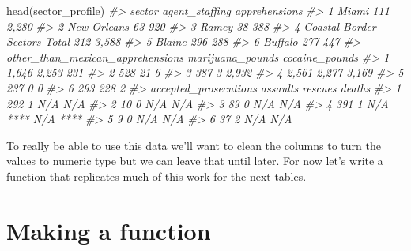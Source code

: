 \documentclass[
  12pt,
]{book}
\newenvironment{Shaded}{\begin{snugshade}}{\end{snugshade}}
\newcommand{\CommentTok}[1]{\textcolor[rgb]{0.37,0.37,0.37}{\textit{#1}}}
\newcommand{\FunctionTok}[1]{\textcolor[rgb]{0,0,0}{#1}}
\newcommand{\NormalTok}[1]{#1}
\begin{document}
\begin{Shaded}
\begin{Highlighting}[]
\FunctionTok{head}\NormalTok{(sector\_profile)}
\CommentTok{\#\textgreater{}                         sector agent\_staffing apprehensions}
\CommentTok{\#\textgreater{} 1                        Miami            111         2,280}
\CommentTok{\#\textgreater{} 2                  New Orleans             63           920}
\CommentTok{\#\textgreater{} 3                        Ramey             38           388}
\CommentTok{\#\textgreater{} 4 Coastal Border Sectors Total            212         3,588}
\CommentTok{\#\textgreater{} 5                       Blaine            296           288}
\CommentTok{\#\textgreater{} 6                      Buffalo            277           447}
\CommentTok{\#\textgreater{}   other\_than\_mexican\_apprehensions marijuana\_pounds cocaine\_pounds}
\CommentTok{\#\textgreater{} 1                            1,646            2,253            231}
\CommentTok{\#\textgreater{} 2                              528               21              6}
\CommentTok{\#\textgreater{} 3                              387                3          2,932}
\CommentTok{\#\textgreater{} 4                            2,561            2,277          3,169}
\CommentTok{\#\textgreater{} 5                              237                0              0}
\CommentTok{\#\textgreater{} 6                              293              228              2}
\CommentTok{\#\textgreater{}   accepted\_prosecutions assaults           rescues deaths}
\CommentTok{\#\textgreater{} 1                   292        1               N/A    N/A}
\CommentTok{\#\textgreater{} 2                    10        0               N/A    N/A}
\CommentTok{\#\textgreater{} 3                    89        0               N/A    N/A}
\CommentTok{\#\textgreater{} 4                   391        1 N/A **** N/A ****       }
\CommentTok{\#\textgreater{} 5                     9        0               N/A    N/A}
\CommentTok{\#\textgreater{} 6                    37        2               N/A    N/A}
\end{Highlighting}
\end{Shaded}

To really be able to use this data we'll want to clean the columns to turn the values to numeric type but we can leave that until later. For now let's write a function that replicates much of this work for the next tables.

\hypertarget{making-a-function}{%
\section{Making a function}\label{making-a-function}}
\end{document}
